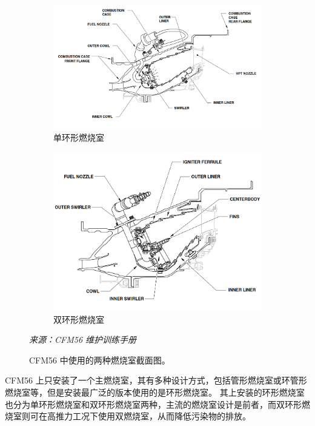 \begin{figure}[!ht]
    \centering
    \begin{subfigure}{0.5\linewidth}
        \includegraphics[width=\linewidth]{combustor-1.png}
        \caption{单环形燃烧室}
    \end{subfigure}
    \hfil
    \begin{subfigure}{0.45\linewidth}
        \includegraphics[width=\linewidth]{combustor-2.png}
        \caption{双环形燃烧室}
    \end{subfigure}
    \caption[CFM56 中使用的两种燃烧室截面图。]{CFM56 中使用的两种燃烧室截面图。}
    \label{fig:part-3-combustor}
    \textit{\small 来源：CFM56 维护训练手册}
\end{figure}

CFM56 上只安装了一个主燃烧室，其有多种设计方式，包括管形燃烧室或环管形燃烧室等，但是安装最广泛的版本使用的是环形燃烧室。
其上安装的环形燃烧室也分为单环形燃烧室和双环形燃烧室两种，主流的燃烧室设计是前者，而双环形燃烧室则可在高推力工况下使用双燃烧室，从而降低污染物的排放。

